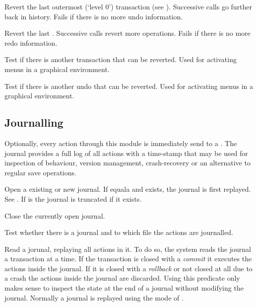 \documentclass[11pt]{article}
\begin{document}
\begin{description}
Revert the last outermost (`level 0') transaction (see
). Successive calls go further back in history. Fails
if there is no more undo information.

Revert the last .  Successive calls revert more 
operations.   Fails if there is no more redo information.

Test if there is another transaction that can be reverted.  Used for
activating menus in a graphical environment.

Test if there is another undo that can be reverted.  Used for
activating menus in a graphical environment.
\end{description}

\subsection{Journalling}

%
Optionally, every action through this module is immediately send to a
. The journal provides a full log of all actions
with a time-stamp that may be used for inspection of behaviour, version
management, crash-recovery or an alternative to regular save operations.

\begin{description}
Open a existing or new journal.  If  equala 
and  exists, the journal is first replayed. See
.  If  is  the journal is
truncated if it exists.

Close the currently open journal.

Test whether there is a journal and to which file the actions are
journalled.

Read a jorunal, replaying all actions in it.  To do so, the system
reads the journal a transaction at a time.  If the transaction is
closed with a \emph{commit} it executes the actions inside the journal.
If it is closed with a \emph{rollback} or not closed at all due to a
crash the actions inside the journal are discarded.  Using this
predicate only makes sense to inspect the state at the end of a journal
without modifying the journal.  Normally a journal is replayed using the
 mode of .
\end{description}
\end{document}
